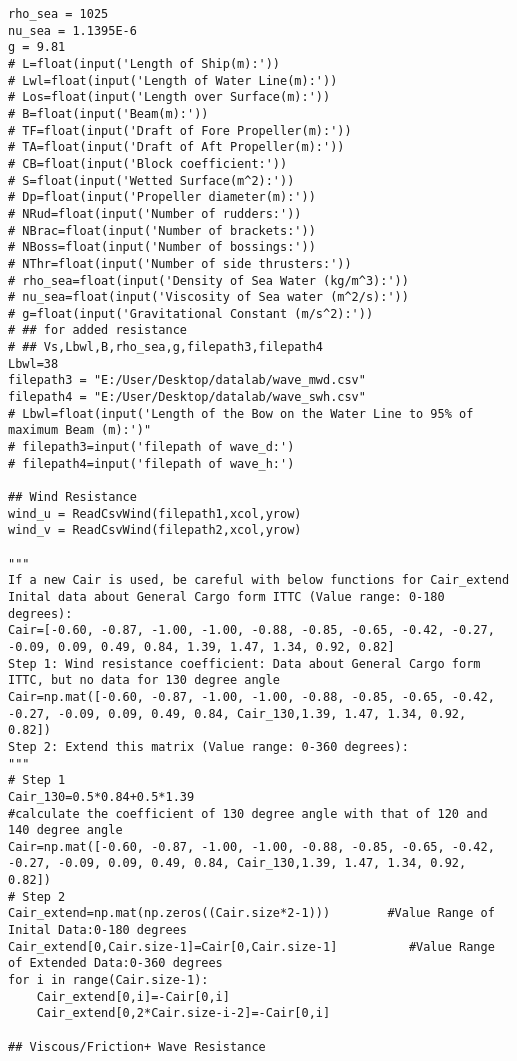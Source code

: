 \begin{lstlisting}[caption=Testing codes (\autoref{TestResults}), label=TestCodes]
rho_sea = 1025
nu_sea = 1.1395E-6
g = 9.81
# L=float(input('Length of Ship(m):'))
# Lwl=float(input('Length of Water Line(m):'))
# Los=float(input('Length over Surface(m):'))
# B=float(input('Beam(m):'))
# TF=float(input('Draft of Fore Propeller(m):'))
# TA=float(input('Draft of Aft Propeller(m):'))
# CB=float(input('Block coefficient:'))
# S=float(input('Wetted Surface(m^2):'))
# Dp=float(input('Propeller diameter(m):'))
# NRud=float(input('Number of rudders:'))
# NBrac=float(input('Number of brackets:'))
# NBoss=float(input('Number of bossings:'))
# NThr=float(input('Number of side thrusters:'))
# rho_sea=float(input('Density of Sea Water (kg/m^3):'))
# nu_sea=float(input('Viscosity of Sea water (m^2/s):'))
# g=float(input('Gravitational Constant (m/s^2):'))
# ## for added resistance
# ## Vs,Lbwl,B,rho_sea,g,filepath3,filepath4
Lbwl=38
filepath3 = "E:/User/Desktop/datalab/wave_mwd.csv"
filepath4 = "E:/User/Desktop/datalab/wave_swh.csv"
# Lbwl=float(input('Length of the Bow on the Water Line to 95% of maximum Beam (m):')"
# filepath3=input('filepath of wave_d:')
# filepath4=input('filepath of wave_h:')

## Wind Resistance
wind_u = ReadCsvWind(filepath1,xcol,yrow)
wind_v = ReadCsvWind(filepath2,xcol,yrow)

""" 
If a new Cair is used, be careful with below functions for Cair_extend
Inital data about General Cargo form ITTC (Value range: 0-180 degrees): 
Cair=[-0.60, -0.87, -1.00, -1.00, -0.88, -0.85, -0.65, -0.42, -0.27, -0.09, 0.09, 0.49, 0.84, 1.39, 1.47, 1.34, 0.92, 0.82]
Step 1: Wind resistance coefficient: Data about General Cargo form ITTC, but no data for 130 degree angle
Cair=np.mat([-0.60, -0.87, -1.00, -1.00, -0.88, -0.85, -0.65, -0.42, -0.27, -0.09, 0.09, 0.49, 0.84, Cair_130,1.39, 1.47, 1.34, 0.92, 0.82])
Step 2: Extend this matrix (Value range: 0-360 degrees):
"""
# Step 1
Cair_130=0.5*0.84+0.5*1.39                                     #calculate the coefficient of 130 degree angle with that of 120 and 140 degree angle
Cair=np.mat([-0.60, -0.87, -1.00, -1.00, -0.88, -0.85, -0.65, -0.42, -0.27, -0.09, 0.09, 0.49, 0.84, Cair_130,1.39, 1.47, 1.34, 0.92, 0.82])
# Step 2
Cair_extend=np.mat(np.zeros((Cair.size*2-1)))        #Value Range of Inital Data:0-180 degrees 
Cair_extend[0,Cair.size-1]=Cair[0,Cair.size-1]          #Value Range of Extended Data:0-360 degrees 
for i in range(Cair.size-1):
    Cair_extend[0,i]=-Cair[0,i]
    Cair_extend[0,2*Cair.size-i-2]=-Cair[0,i]

## Viscous/Friction+ Wave Resistance


\end{lstlisting}
